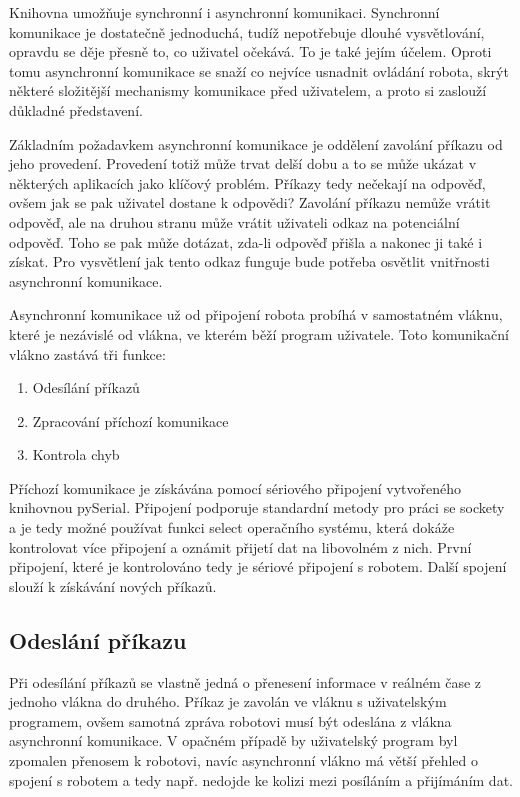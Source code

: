 \documentclass[12pt,notitlepage]{report}
\begin{document}
    Knihovna umožňuje synchronní i asynchronní komunikaci. Synchronní
    komunikace je dostatečně jednoduchá, tudíž nepotřebuje dlouhé vysvětlování,
    opravdu se děje přesně to, co uživatel očekává. To je také jejím účelem.
    Oproti tomu asynchronní komunikace se snaží co nejvíce usnadnit ovládání
    robota, skrýt některé složitější mechanismy komunikace před uživatelem, a
    proto si zaslouží důkladné představení.

    Základním požadavkem asynchronní komunikace je oddělení zavolání příkazu od
    jeho provedení. Provedení totiž může trvat delší dobu a to se může ukázat v
    některých aplikacích jako klíčový problém. Příkazy tedy nečekají na
    odpověď, ovšem jak se pak uživatel dostane k odpovědi? Zavolání příkazu
    nemůže vrátit odpověď, ale na druhou stranu může vrátit uživateli odkaz na
    potenciální odpověď. Toho se pak může dotázat, zda-li odpověď přišla a
    nakonec ji také i získat. Pro vysvětlení jak tento odkaz funguje bude
    potřeba osvětlit vnitřnosti asynchronní komunikace.

    Asynchronní komunikace už od připojení robota probíhá v samostatném vláknu,
    které je nezávislé od vlákna, ve kterém běží program uživatele. Toto
    komunikační vlákno zastává tři funkce:

    \begin{enumerate}
        \item Odesílání příkazů
        \item Zpracování příchozí komunikace
        \item Kontrola chyb
    \end{enumerate}

    Příchozí komunikace je získávána pomocí sériového připojení vytvořeného
    knihovnou pySerial. Připojení podporuje standardní metody pro práci se
    sockety a je tedy možné používat funkci select operačního systému, která
    dokáže kontrolovat více připojení a oznámit přijetí dat na libovolném z
    nich. První připojení, které je kontrolováno tedy je sériové připojení s
    robotem. Další spojení slouží k získávání nových příkazů.

    \subsection{Odeslání příkazu}

    Při odesílání příkazů se vlastně jedná o přenesení informace v reálném čase
    z jednoho vlákna do druhého. Příkaz je zavolán ve vláknu s uživatelským
    programem, ovšem samotná zpráva robotovi musí být odeslána z vlákna
    asynchronní komunikace. V opačném případě by uživatelský program byl
    zpomalen přenosem k robotovi, navíc asynchronní vlákno má větší přehled o
    spojení s robotem a tedy např. nedojde ke kolizi mezi posíláním a
    přijímáním dat.
\end{document}
